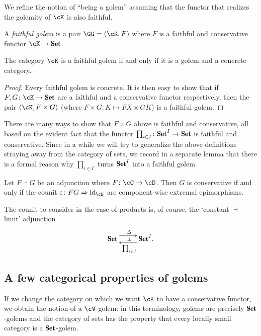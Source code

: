 \documentclass[a4paper,10pt,draft]{amsart}
\begin{document}
We refine the notion of ``being a golem'' assuming that the functor that realizes the golemity of $\cK$ is also faithful.
\begin{definition}
A \emph{faithful golem} is a pair $\GG = (\cK, F)$ where $F$ is a faithful and conservative functor $\cK \to \Set$.
\end{definition}\label{faith_glamim_are_concrete}
\begin{remark}
The category $\cK$ is a faithful golem if and only if it is a golem and a concrete category.
\end{remark}
\begin{proof}
Every faithful golem is concrete. It is then easy to show that if $F,G\colon \cK \to \Set$ are a faithful and a conservative functor respectively, then the pair $(\cK, F\times G)$ (where $F\times G \colon K \mapsto FX \times GK$) is a faithful golem.
\end{proof}
\begin{remark}
There are many ways to show that $F\times G$ above is faithful and conservative, all based on the evident fact that the functor $\prod_{i\in I}\colon \Set^I \to \Set$ is faithful and conservative. Since in a while we will try to generalize the above definitions straying away from the category of sets, we record in a separate lemma that there is a formal reason why $\prod_{i\in I}$ turns $\Set^I$ into a faithful golem.
\end{remark}
\begin{lemma}
Let $F\dashv G$ be an adjunction where $F \colon \cC \to \cD$. Then $G$ is conservative if and only if the counit $\varepsilon \colon FG \Rightarrow \id_{\cD}$ are component-wise extremal epimorphisms.
\end{lemma}
The counit to consider in the case of products is, of course, the `constant $\dashv$ limit' adjunction 
\[
\xymatrix{
	\Set \ar@<5pt>[r]^\Delta \ar@{}[r]|\perp & \ar@<5pt>[l]^{\prod_{i\in I}} \Set^I.
}
\]
\subsection{A few categorical properties of golems}
If we change the category on which we want $\cK$ to have a conservative functor, we obtain the notion of a $\cV$-golem: in this terminology, golems are precisely $\Set$-golems and the category of sets has the property that every locally small category is a $\Set$-golem.
\end{document}
